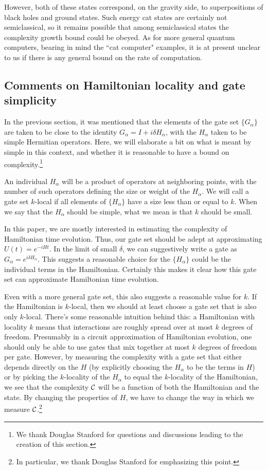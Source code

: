 \documentclass[12pt]{article}
\numberwithin{equation}{section}
\def\CC{{\cal C}}
\begin{document}
However, both of these states correspond, on the gravity side, to superpositions of black holes and ground states. Such energy cat states are certainly not semiclassical, so it remains possible that among semiclassical states the complexity growth bound could be obeyed. As for more general quantum computers, bearing in mind the ``cat computer" examples, it is at present unclear to us if there is any general bound on the rate of computation.

\subsection{Comments on Hamiltonian locality and gate simplicity} \label{sec:appendix:A1}

In the previous section, it was mentioned that the elements of the gate set  $\{G_\alpha\}$ are taken to be close to the identity $G_\alpha = I + i \delta H_\alpha$, with the $H_\alpha$ taken to be simple Hermitian operators. Here, we will elaborate a bit on what is meant by simple in this context, and whether it is reasonable to have a bound on complexity.\footnote{We thank Douglas Stanford for questions and discussions leading to the creation of this section.}

An individual $H_\alpha$ will be a product of operators  at neighboring points, with the number of such operators defining the size or weight of the $H_\alpha$. We will call a gate set $k$-local if all elements of $\{H_\alpha\}$ have a size less than or equal to $k$. When we say that the $H_\alpha$ should be simple, what we mean is that $k$ should be small.

In this paper, we are mostly interested in estimating the complexity of Hamiltonian time evolution. Thus, our gate set should be adept at approximating $U(t)=e^{-iHt}$. In the limit of small $\delta$, we can suggestively write a gate as $G_\alpha = e^{i \delta H_\alpha }$. This suggests a reasonable choice for the $\{H_\alpha\}$ could be the individual terms in the Hamiltonian. Certainly this makes it clear how this gate set can approximate  Hamiltonian time evolution.

Even with a more general gate set, this also suggests a reasonable value for $k$. If the Hamiltonian is $k$-local, then we should at least choose a gate set that is also only $k$-local. There's some reasonable intuition behind this: a Hamiltonian with locality $k$ means that interactions are roughly spread over at most $k$ degrees of freedom. Presumably in a circuit approximation of Hamiltonian evolution, one should only be able to use gates that mix together at most $k$ degrees of freedom per gate. However, by measuring the complexity with a gate set that either depends directly on the $H$ (by explicitly choosing the $H_\alpha$ to be the terms in $H$) or by picking the $k$-locality of the $H_\alpha$ to equal the $k$-locality of the Hamiltonian, we see that the complexity $\CC$ will be a function of both the Hamiltonian and the state. By changing the properties of $H$, we have to change the way in which we measure $\CC$.\footnote{In particular, we thank Douglas Stanford for emphasizing this point.}
\end{document}
